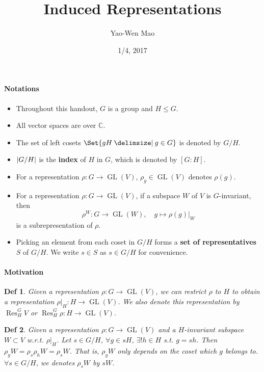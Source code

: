 \documentclass[a4paper]{article}
\title{Induced Representations}
\author{Yao-Wen Mao}
\date{1/4, 2017}
\DeclarePairedDelimiter{\abs}{\lvert}{\rvert}
\newcommand*{\Cb}{\mathbb{C}}
\DeclareMathOperator{\Res}{Res}
\newcommand*\GL[1]{\operatorname{GL}\mathopen{}\left({#1}\right)\mathclose{}}
\providecommand\given{}
\newcommand*\SetSymbol[1][]{%
  \nonscript\:#1\vert
  \allowbreak
  \nonscript\:
\mathopen{}}
\renewcommand\given{\SetSymbol[\delimsize]}
\renewcommand\given{\SetSymbol[\delimsize]}
\theoremstyle{mystyle}
\newtheorem{definition}{Def}
\begin{document}
\maketitle
\paragraph{Notations} \mbox{}
\begin{itemize}
  \item Throughout this handout, $G$ is a group and $H \le G$.
  \item All vector spaces are over $\Cb$.
  \item The set of left cosets $\Set{ gH \given g \in G }$ is denoted by $G/H$.
  \item $\abs{G/H}$ is the {\bf index} of $H$ in $G$, which is
    denoted by $[G:H]$.
  \item For a representation $\rho: G\to \GL{V}$, $\rho_g \in \GL{V}$ denotes
    $\rho(g)$.
  \item For a representation $\rho: G\to \GL{V}$, if a subspace $W$ of $V$
    is $G$-invariant, then
    \[
      \rho^W: G\to \GL{W}, \quad g \mapsto \rho(g)|_W
    \]
    is a subrepresentation of $\rho$.
  \item Picking an element from each coset in $G/H$ forms a 
    {\bf set of representatives} $S$ of $G/H$.
    We write $s\in S$ as $s\in G/H$ for convenience.
\end{itemize}

\paragraph{Motivation} \mbox{}
\begin{definition}
  Given a representation $\rho: G \to \GL{V}$, we can restrict $\rho$ to $H$
  to obtain a representation $\rho|_H: H \to \GL{V}$. We also denote this
  representation by $\Res^G_H V$ or $\Res^G_H \rho : H\to \GL{V}$.
\end{definition}

\begin{definition}
  Given a representation $\rho: G\to \GL{V}$ and a $H$-invariant
  subspace $W \subset V$ w.r.t. $\rho|_H$. Let $s\in G/H$, $\forall g \in sH$,
  $\exists! h \in H$ s.t. $g = sh$.
  Then $\rho_g W = \rho_s \rho_h W = \rho_s W$. That is, $\rho_g W$ only
  depends on the coset which $g$ belongs to. $\forall s \in G/H$,
  we denotes $\rho_s W$ by $sW$.
\end{definition}
\end{document}
